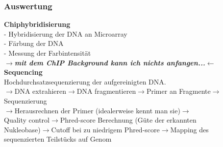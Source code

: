 \subsubsection{Auswertung}
\hspace*{10mm}\textbf{Chiphybridisierung}\\
\hspace*{20mm}- Hybridisierung der DNA an Microarray\\
\hspace*{20mm}- Färbung der DNA\\
\hspace*{20mm}- Messung der Farbintensität\\
$\rightarrow$\textit{\textbf{mit dem ChIP Background kann ich nichts anfangen...}}$\leftarrow$\\
\hspace*{10mm}\textbf{Sequencing}\\
\hspace*{20mm}Hochdurchsatzsequenzierung der aufgereinigten DNA.\\
\hspace*{20mm}$\rightarrow$DNA extrahieren$\rightarrow$DNA fragmentieren$\rightarrow$Primer an Fragmente$\rightarrow$Sequenzierung\\
\hspace*{20mm}$\rightarrow$Herausrechnen der Primer (idealerweise kennt man sie)$\rightarrow$\\
\hspace*{20mm}Quality control$\rightarrow$Phred-score Berechnung (Güte der erkannten\\
\hspace*{20mm}Nukleobase)$\rightarrow$Cutoff bei zu niedrigem Phred-score$\rightarrow$Mapping des\\
\hspace*{20mm}sequenzierten Teilstücks auf Genom

